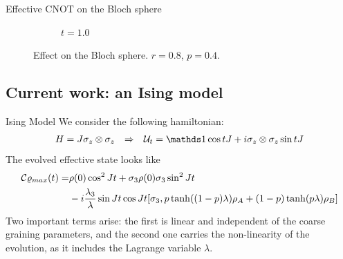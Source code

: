 \begin{frame}{Effective CNOT on the Bloch sphere}
\begin{figure}[h!]
\begin{subfigure}{0.32\textwidth}
            \caption{$t=1.0$}
        \end{subfigure}
        \caption{Effect on the Bloch sphere. $r=0.8$, $p=0.4$.}
    \end{figure}
\end{frame}

\subsection{Current work: an Ising model}

\begin{frame}{Ising Model}
    We consider the following hamiltonian:
    \begin{align*}
        H=J\sigma_{z}\otimes\sigma_{z} && \Rightarrow && \mcU_{t}=\Id \cos{tJ} + i\sigma_{z}\otimes\sigma_{z}\sin{tJ}
    \end{align*}
    The evolved effective state looks like
    \begin{align*}
        \mathcal{C}{\varrho_{max}(t)}=&\rho(0)\cos^{2}{Jt}+\sigma_{3}\rho(0)\sigma_{3}\sin^{2}{Jt}\\
        &-i\frac{\lambda_{3}}{\lambda}\sin{Jt}\cos{Jt}[\sigma_{3},p\tanh((1-p)\lambda)\rho_{A}+(1-p)\tanh(p\lambda)\rho_{B}]
    \end{align*}
    Two important terms arise: the first is linear and independent of the coarse graining parameters, and the second one carries the non-linearity of the evolution, as it includes the Lagrange variable $\lambda$.
\end{frame}